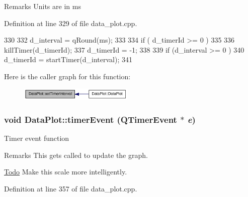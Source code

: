 \begin{DoxyRemark}{Remarks}
Units are in ms 
\end{DoxyRemark}




Definition at line 329 of file data\_\-plot.cpp.




\begin{DoxyCode}
330 {
332     d_interval = qRound(ms);
333 
334     if ( d_timerId >= 0 )
335     {
336         killTimer(d_timerId);
337         d_timerId = -1;
338     }
339     if (d_interval >= 0 )
340         d_timerId = startTimer(d_interval);
341 }
\end{DoxyCode}




Here is the caller graph for this function:\nopagebreak
\begin{figure}[H]
\begin{center}
\leavevmode
\includegraphics[width=154pt]{classDataPlot_a926020e0c49d78d3d5d282848368651e_icgraph}
\end{center}
\end{figure}


\hypertarget{classDataPlot_a41c9c4bc12d8d3e3abdf893c4fcfad7b}{
\subsubsection[{timerEvent}]{\setlength{\rightskip}{0pt plus 5cm}void DataPlot::timerEvent (QTimerEvent $\ast$ {\em e})}}
\label{classDataPlot_a41c9c4bc12d8d3e3abdf893c4fcfad7b}
Timer event function

\begin{DoxyRemark}{Remarks}
This gets called to update the graph. 
\end{DoxyRemark}


\begin{Desc}
\item[\hyperlink{todo__todo000002}{Todo}]Make this scale more intelligently. \end{Desc}




Definition at line 357 of file data\_\-plot.cpp.




